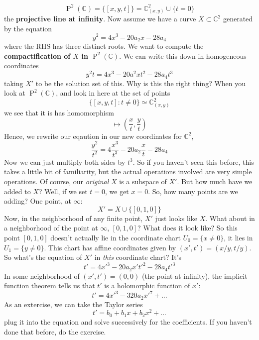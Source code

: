 \documentclass{article}
\newcommand{\mbb}[1]{\mathbb{#1}}
\DeclareMathOperator{\BigP}{P}
\newcommand{\Prj}[2]{\BigP^{#1}({#2})}
\begin{document}
\begin{equation}\Prj{2}{\mbb{C}} = \{[x, y, t]\} = \mbb{C}^2_{(x, y)} \cup \{t = 0\}\end{equation}
the \textbf{projective line at infinity}.
Now assume we have a curve \(X \subset \mbb{C}^2\) generated by the equation
\begin{equation}y^2 = 4x^3 - 20a_2x - 28a_4\end{equation}
where the RHS has three distinct roots. We want to compute the \textbf{compactification of \(X\) in \(\Prj{2}{\mbb{C}}\)}. We can write this down in homogeneous coordinates
\begin{equation}y^2t = 4x^3 - 20a^2xt^2 - 28a_4t^3\end{equation}
taking \(X'\) to be the solution set of this.
Why is this the right thing? When you look at \(\Prj{2}{\mbb{C}}\), and look in here at the set of points
\begin{equation}\{[x, y, t]: t \neq 0\} \simeq \mbb{C}^2_{(x, y)}\end{equation}
we see that it is has homomorphism
\begin{equation}[x, y, t] \mapsto \left(\frac{x}{t}, \frac{y}{t}\right)\end{equation}
Hence, we rewrite our eqaution in our new coordinates for \(\mbb{C}^2\),
\begin{equation}\frac{y^2}{t^2} = 4\frac{x^3}{t^3} - 20a_2\frac{x}{t} - 28a_4\end{equation}
Now we can just multiply both sides by \(t^3\). So if you haven't seen this before, this takes a little bit of familiarity, but the actual operations involved are very simple operations. Of course, our \textit{original} \(X\) is a subspace of \(X'\). But how much have we added to \(X\)? Well, if we set \(t = 0\), we get \(x = 0\). So, how many points are we adding? One point, at \(\infty\):
\begin{equation}X' = X \cup \{[0, 1, 0]\}\end{equation}
Now, in the neighborhood of any finite point, \(X'\) just looks like \(X\). What about in a neighborhood of the point at \(\infty\), \([0, 1, 0]\)? What does it look like?
So this point \([0, 1, 0]\) doesn't actually lie in the coordinate chart \(U_0 = \{x \neq 0\}\), it lies in \(U_1 = \{y \neq 0\}\). This chart has affine coordinates given by \((x', t') = (x/y, t/y)\). So what's the equation of \(X'\) in \textit{this} coordinate chart? It's
\begin{equation}t' = 4x'^3 - 20a_2x't'^2 - 28a_4t'^3\end{equation}
In some neighborhood of \((x', t') = (0, 0)\) (the point at infinity), the implicit function theorem tells us that \(t'\) is a holomorphic function of \(x'\):
\begin{equation}t' = 4x'^3 - 320a_2x'^7 + ...\end{equation}
As an extercise, we can take the Taylor series
\begin{equation}t' = b_0 + b_1x + b_2x^2 + ...\end{equation}
plug it into the equation and solve successively for the coefficients. If you haven't done that before, do the exercise.
\end{document}
